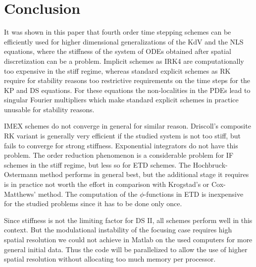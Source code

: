 \documentclass[final]{siamltex}
\begin{document}
\section{Conclusion}
It was shown in this paper that fourth order time stepping schemes can be 
efficiently used for higher dimensional generalizations of the KdV 
and the NLS equations, where the stiffness of the system of ODEs 
obtained after spatial discretization can be a problem. Implicit 
schemes as IRK4 are computationally too expensive in the stiff regime, whereas standard explicit 
schemes as RK require for stability reasons too restrictive 
requirements on 
the time steps for the KP and DS equations. For these equations the 
non-localities in the PDEs lead to singular Fourier multipliers which 
make standard explicit schemes in practice unusable for stability 
reasons.

IMEX schemes do not converge in general for similar reason. 
Driscoll's composite RK variant is generally very efficient if the studied 
system is not too stiff, but fails to converge for strong stiffness. 
Exponential integrators do not have this problem.  The order reduction phenomenon is a 
considerable problem for IF schemes in the stiff regime, but less so 
for ETD schemes. The Hochbruck-Ostermann method performs in general 
best, but the additional stage it requires is in practice not 
worth the effort in comparison with Krogstad's or Cox-Matthews' method. The computation of 
the $\phi$-functions in ETD is inexpensive for the studied problems since it 
has to be done only once. 

Since stiffness is not the limiting factor for DS II, all schemes perform 
well in this context. But the modulational instability of the focusing case requires 
high spatial resolution we could not achieve in Matlab on the used 
computers for more general initial data. Thus the code will be 
parallelized to allow the use of higher spatial resolution without 
allocating too much memory per processor. 


{}
\end{document}
